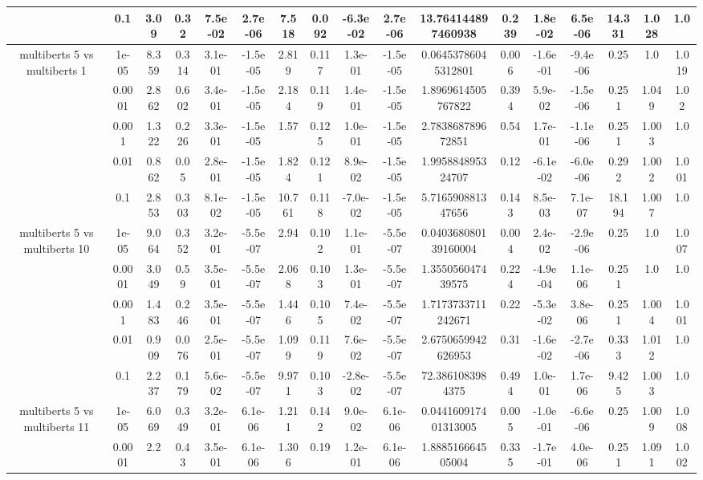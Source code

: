 \begin{tabular}{|c|c|c|c|c|c|c|c|c|c|c|c|c|c|c|c|c|}
 & 0.1 & 3.09 & 0.32 & 7.5e-02 & 2.7e-06 & 7.518 & 0.092 & -6.3e-02 & 2.7e-06 & 13.764144897460938 & 0.239 & 1.8e-02 & 6.5e-06 & 14.331 & 1.028 & 1.0 \\
\hline
\multirow{5}{*}{multiberts 5 vs multiberts 1} & 1e-05 & 8.359 & 0.314 & 3.1e-01 & -1.5e-05 & 2.819 & 0.117 & 1.3e-01 & -1.5e-05 & 0.06453786045312801 & 0.006 & -1.6e-01 & -9.4e-06 & 0.25 & 1.0 & 1.019 \\
 & 0.0001 & 2.862 & 0.602 & 3.4e-01 & -1.5e-05 & 2.184 & 0.119 & 1.4e-01 & -1.5e-05 & 1.8969614505767822 & 0.394 & 5.9e-02 & -1.5e-06 & 0.251 & 1.049 & 1.02 \\
 & 0.001 & 1.322 & 0.226 & 3.3e-01 & -1.5e-05 & 1.57 & 0.125 & 1.0e-01 & -1.5e-05 & 2.783868789672851 & 0.54 & 1.7e-01 & -1.1e-06 & 0.251 & 1.003 & 1.0 \\
 & 0.01 & 0.862 & 0.05 & 2.8e-01 & -1.5e-05 & 1.824 & 0.121 & 8.9e-02 & -1.5e-05 & 1.995884895324707 & 0.12 & -6.1e-02 & -6.0e-06 & 0.292 & 1.002 & 1.001 \\
 & 0.1 & 2.853 & 0.303 & 8.1e-02 & -1.5e-05 & 10.761 & 0.118 & -7.0e-02 & -1.5e-05 & 5.716590881347656 & 0.143 & 8.5e-03 & 7.1e-07 & 18.194 & 1.007 & 1.0 \\
\hline
\multirow{5}{*}{multiberts 5 vs multiberts 10} & 1e-05 & 9.064 & 0.352 & 3.2e-01 & -5.5e-07 & 2.94 & 0.102 & 1.1e-01 & -5.5e-07 & 0.040368080139160004 & 0.004 & 2.4e-02 & -2.9e-06 & 0.25 & 1.0 & 1.007 \\
 & 0.0001 & 3.049 & 0.59 & 3.5e-01 & -5.5e-07 & 2.068 & 0.103 & 1.3e-01 & -5.5e-07 & 1.355056047439575 & 0.224 & -4.9e-04 & 1.1e-06 & 0.251 & 1.0 & 1.0 \\
 & 0.001 & 1.483 & 0.246 & 3.5e-01 & -5.5e-07 & 1.446 & 0.105 & 7.4e-02 & -5.5e-07 & 1.7173733711242671 & 0.22 & -5.3e-02 & 3.8e-06 & 0.251 & 1.004 & 1.001 \\
 & 0.01 & 0.909 & 0.076 & 2.5e-01 & -5.5e-07 & 1.099 & 0.119 & 7.6e-02 & -5.5e-07 & 2.6750659942626953 & 0.31 & -1.6e-02 & -2.7e-06 & 0.333 & 1.012 & 1.0 \\
 & 0.1 & 2.237 & 0.179 & 5.6e-02 & -5.5e-07 & 9.971 & 0.103 & -2.8e-02 & -5.5e-07 & 72.3861083984375 & 0.494 & 1.0e-01 & 1.7e-06 & 9.425 & 1.003 & 1.0 \\
\hline
\multirow{5}{*}{multiberts 5 vs multiberts 11} & 1e-05 & 6.069 & 0.349 & 3.2e-01 & 6.1e-06 & 1.211 & 0.142 & 9.0e-02 & 6.1e-06 & 0.044160917401313005 & 0.005 & -1.0e-01 & -6.6e-06 & 0.25 & 1.009 & 1.008 \\
 & 0.0001 & 2.2 & 0.43 & 3.5e-01 & 6.1e-06 & 1.306 & 0.19 & 1.2e-01 & 6.1e-06 & 1.888516664505004 & 0.335 & -1.7e-01 & 4.0e-06 & 0.251 & 1.091 & 1.002 \\

\end{tabular}
